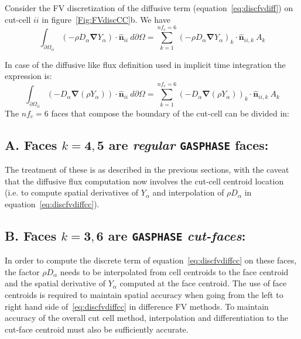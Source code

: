 Consider the FV discretization of the diffusive term (equation~\eqref{eq:discfvdiff}) on cut-cell $ii$ in figure~\ref{Fig:FVdiscCC}b. We have
%
\begin{equation}
    \int_{\partial \Omega_{ii}} { \left( - \rho D_\alpha \boldsymbol{\nabla} Y_\alpha \right) \cdot \hat{\mathbf{n}}_{ii} } \: d \partial \Omega = \sum^{nf_c=6}_{k=1}
    \left( - \rho D_\alpha \boldsymbol{\nabla} Y_\alpha \right)_k \cdot \hat{\mathbf{n}}_{ii,k} \: A_k \label{eq:discfvdiffcc}
\end{equation}
%

In case of the diffusive like flux definition used in implicit time integration the expression is:
%
\begin{equation}
    \int_{\partial \Omega_{ii}} { \left( - D_\alpha \boldsymbol{\nabla} \left(  \rho Y_\alpha \right) \right) \cdot \hat{\mathbf{n}}_{ii} } \: d \partial \Omega = \sum^{nf_c=6}_{k=1}
    \left( - D_\alpha \boldsymbol{\nabla} \left(  \rho Y_\alpha \right) \right)_k \cdot \hat{\mathbf{n}}_{ii,k} \: A_k \label{eq:discfvdiffcc2}
\end{equation}
%
The $nf_c=6$ faces that compose the boundary of the cut-cell can be divided in:

\subsection*{A. Faces $k=\mathbf{4},\mathbf{5}$ are \textit{regular} \texttt{GASPHASE} faces:}
The treatment of these is as described in the previous sections, with the caveat that the diffusive flux computation now involves the cut-cell centroid location (i.e. to compute spatial derivatives of $Y_\alpha$ and interpolation of $\rho D_\alpha$ in equation~\eqref{eq:discfvdiffcc}).

\subsection*{B. Faces $k=\mathbf{3},\mathbf{6}$ are \texttt{GASPHASE} \textit{cut-faces}:}

In order to compute the discrete term of equation~\eqref{eq:discfvdiffcc} on these faces, the factor $\rho D_\alpha$ needs to be interpolated from cell centroids to the face centroid and the spatial derivative of $Y_\alpha$ computed at the face centroid. The use of face centroids is required to maintain spatial accuracy when going from the left to right hand side of~\eqref{eq:discfvdiffcc} in difference FV methods. To maintain accuracy of the overall cut cell method, interpolation and differentiation to the cut-face centroid must also be sufficiently accurate.

